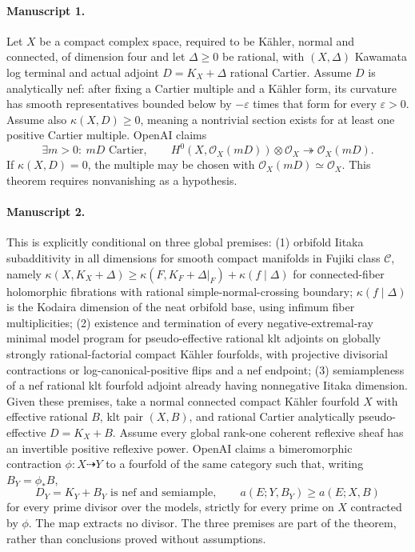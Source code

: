 \documentclass[11pt]{article}
\begin{document}
\paragraph{Manuscript 1.}
Let $X$ be a compact complex space, required to be Kähler, normal and connected, of dimension four and let $\Delta\ge0$ be rational, with $(X,\Delta)$ Kawamata log terminal and actual adjoint $D=K_X+\Delta$ rational Cartier. Assume $D$ is analytically nef: after fixing a Cartier multiple and a Kähler form, its curvature has smooth representatives bounded below by $-\varepsilon$ times that form for every $\varepsilon>0$. Assume also $\kappa(X,D)\ge0$, meaning a nontrivial section exists for at least one positive Cartier multiple. OpenAI claims
\[
\exists m>0:\ mD\text{ Cartier},\qquad
H^0(X,\mathcal O_X(mD))\otimes\mathcal O_X\twoheadrightarrow\mathcal O_X(mD).
\]
If $\kappa(X,D)=0$, the multiple may be chosen with $\mathcal O_X(mD)\simeq\mathcal O_X$. This theorem requires nonvanishing as a hypothesis.

\paragraph{Manuscript 2.}
This is explicitly conditional on three global premises: (1) orbifold Iitaka subadditivity in all dimensions for smooth compact manifolds in Fujiki class $\mathcal C$, namely $\kappa(X,K_X+\Delta)\ge\kappa(F,K_F+\Delta|_F)+\kappa(f\mid\Delta)$ for connected-fiber holomorphic fibrations with rational simple-normal-crossing boundary; $\kappa(f\mid\Delta)$ is the Kodaira dimension of the neat orbifold base, using infimum fiber multiplicities; (2) existence and termination of every negative-extremal-ray minimal model program for pseudo-effective rational klt adjoints on globally strongly rational-factorial compact Kähler fourfolds, with projective divisorial contractions or log-canonical-positive flips and a nef endpoint; (3) semiampleness of a nef rational klt fourfold adjoint already having nonnegative Iitaka dimension.
Given these premises, take a normal connected compact Kähler fourfold $X$ with effective rational $B$, klt pair $(X,B)$, and rational Cartier analytically pseudo-effective $D=K_X+B$. Assume every global rank-one coherent reflexive sheaf has an invertible positive reflexive power. OpenAI claims a bimeromorphic contraction $\phi:X\dashrightarrow Y$ to a fourfold of the same category such that, writing $B_Y=\phi_*B$,
\[
D_Y=K_Y+B_Y\text{ is nef and semiample},\qquad
 a(E;Y,B_Y)\ge a(E;X,B)
\]
for every prime divisor over the models, strictly for every prime on $X$ contracted by $\phi$. The map extracts no divisor. The three premises are part of the theorem, rather than conclusions proved without assumptions.
\end{document}
